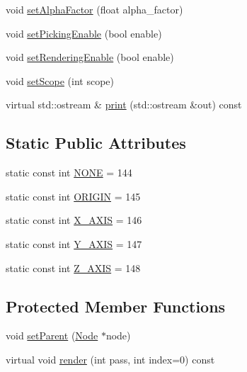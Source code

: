 \begin{CompactItemize}
\item 
void \hyperlink{classm3g_1_1Node_b33c321ce240770e5eb64d0e20ea61cc}{setAlphaFactor} (float alpha\_\-factor)
\item 
void \hyperlink{classm3g_1_1Node_4f9296202713ac56ccae72d5e0c21d96}{setPickingEnable} (bool enable)
\item 
void \hyperlink{classm3g_1_1Node_58981ef7aea1bf0e630bcc065b2987e9}{setRenderingEnable} (bool enable)
\item 
void \hyperlink{classm3g_1_1Node_55f324f307a01705b9094a73af4ecd68}{setScope} (int scope)
\item 
virtual std::ostream \& \hyperlink{classm3g_1_1Node_6fea17fa1532df3794f8cb39cb4f911f}{print} (std::ostream \&out) const 
\end{CompactItemize}
\subsection*{Static Public Attributes}
\begin{CompactItemize}
\item 
static const int \hyperlink{classm3g_1_1Node_7b20f1b443e093d5ec5e990e73b47232}{NONE} = 144
\item 
static const int \hyperlink{classm3g_1_1Node_1b0d56eb173868ff472a6fd296c5bb6c}{ORIGIN} = 145
\item 
static const int \hyperlink{classm3g_1_1Node_dd4bccb7b9c652e726d58b06bd28dab2}{X\_\-AXIS} = 146
\item 
static const int \hyperlink{classm3g_1_1Node_3248ff73b5411ab0a66a38c451c8b6fe}{Y\_\-AXIS} = 147
\item 
static const int \hyperlink{classm3g_1_1Node_a928e648c9ae9b4706937831f77f0c67}{Z\_\-AXIS} = 148
\end{CompactItemize}
\subsection*{Protected Member Functions}
\begin{CompactItemize}
\item 
void \hyperlink{classm3g_1_1Node_880ecc7c1c091f7607eeae12ed100a9a}{setParent} (\hyperlink{classm3g_1_1Node}{Node} $\ast$node)
\item 
virtual void \hyperlink{classm3g_1_1Node_1efcb1973989d9963d5bd6d03065d389}{render} (int pass, int index=0) const 
\end{CompactItemize}
